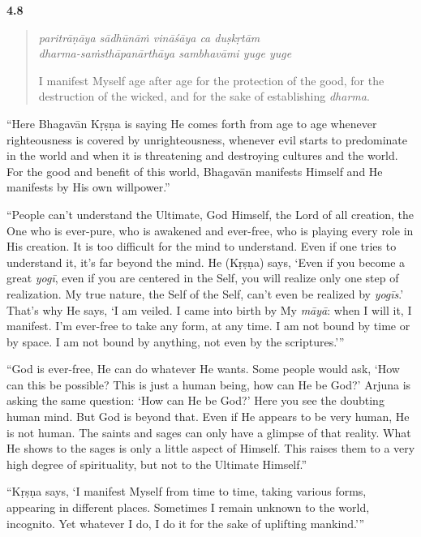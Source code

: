 \par\noindent\textbf{4.8}\par
\begin{verse}
\textit{paritrāṇāya sādhūnāṁ vināśāya ca duṣkṛtām} \\
\textit{dharma-saṁsthāpanārthāya sambhavāmi yuge yuge}

\noindent I manifest Myself age after age for the protection of the good, for the destruction of the wicked, and for the sake of establishing \textit{dharma}.
\end{verse}
\par


\enquote{Here Bhagavān Kṛṣṇa is saying He comes forth from age to age whenever righteousness is covered by unrighteousness, whenever evil starts to predominate in the world and when it is threatening and destroying cultures and the world. For the good and benefit of this world, Bhagavān manifests Himself and He manifests by His own willpower.}

\enquote{People can’t understand the Ultimate, God Himself, the Lord of all creation, the One who is ever-pure, who is awakened and ever-free, who is playing every role in His creation. It is too difficult for the mind to understand. Even if one tries to understand it, it’s far beyond the mind. He (Kṛṣṇa) says, \enquote{Even if you become a great \textit{yogī}, even if you are centered in the Self, you will realize only one step of realization. My true nature, the Self of the Self, can’t even be realized by \textit{yogīs}.} That’s why He says, \enquote{I am veiled. I came into birth by My \textit{māyā}: when I will it, I manifest. I’m ever-free to take any form, at any time. I am not bound by time or by space. I am not bound by anything, not even by the scriptures.}}

\enquote{God is ever-free, He can do whatever He wants. Some people would ask, \enquote{How can this be possible? This is just a human being, how can He be God?} Arjuna is asking the same question: \enquote{How can He be God?} Here you see the doubting human mind. But God is beyond that. Even if He appears to be very human, He is not human. The saints and sages can only have a glimpse of that reality. What He shows to the sages is only a little aspect of Himself. This raises them to a very high degree of spirituality, but not to the Ultimate Himself.}

\enquote{Kṛṣṇa says, \enquote{I manifest Myself from time to time, taking various forms, appearing in different places. Sometimes I remain unknown to the world, incognito. Yet whatever I do, I do it for the sake of uplifting mankind.}}

